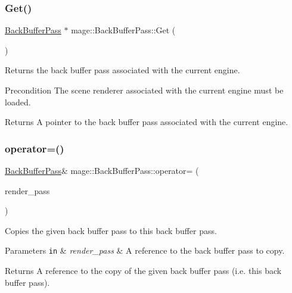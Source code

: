 \subsubsection{\texorpdfstring{Get()}{Get()}}
{\footnotesize\ttfamily \hyperlink{classmage_1_1_back_buffer_pass}{Back\+Buffer\+Pass} $\ast$ mage\+::\+Back\+Buffer\+Pass\+::\+Get (\begin{DoxyParamCaption}{ }\end{DoxyParamCaption})\hspace{0.3cm}{\ttfamily [static]}}

Returns the back buffer pass associated with the current engine.

\begin{DoxyPrecond}{Precondition}
The scene renderer associated with the current engine must be loaded. 
\end{DoxyPrecond}
\begin{DoxyReturn}{Returns}
A pointer to the back buffer pass associated with the current engine. 
\end{DoxyReturn}
\hypertarget{classmage_1_1_back_buffer_pass_a6d1fb713b11b30a08f6d811b5e1fe29b}{}\label{classmage_1_1_back_buffer_pass_a6d1fb713b11b30a08f6d811b5e1fe29b} 
\subsubsection{\texorpdfstring{operator=()}{operator=()}\hspace{0.1cm}{\footnotesize\ttfamily [1/2]}}
{\footnotesize\ttfamily \hyperlink{classmage_1_1_back_buffer_pass}{Back\+Buffer\+Pass}\& mage\+::\+Back\+Buffer\+Pass\+::operator= (\begin{DoxyParamCaption}\item[{const \hyperlink{classmage_1_1_back_buffer_pass}{Back\+Buffer\+Pass} \&}]{render\+\_\+pass }\end{DoxyParamCaption})\hspace{0.3cm}{\ttfamily [delete]}}

Copies the given back buffer pass to this back buffer pass.


\begin{DoxyParams}[1]{Parameters}
\mbox{\tt in}  & {\em render\+\_\+pass} & A reference to the back buffer pass to copy. \\
\hline
\end{DoxyParams}
\begin{DoxyReturn}{Returns}
A reference to the copy of the given back buffer pass (i.\+e. this back buffer pass). 
\end{DoxyReturn}
\hypertarget{classmage_1_1_back_buffer_pass_a63adba9a29335c03c30842de8836302a}{}\label{classmage_1_1_back_buffer_pass_a63adba9a29335c03c30842de8836302a} 
